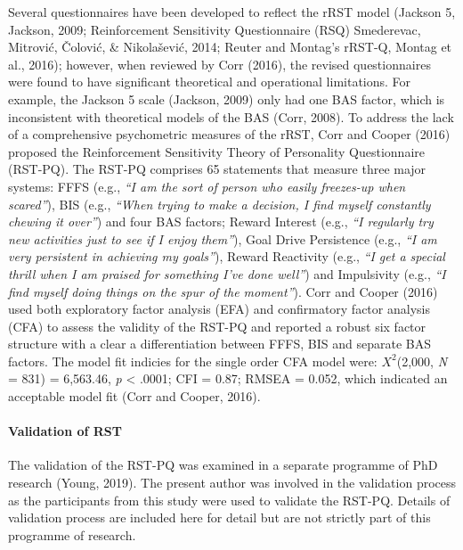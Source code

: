 \documentclass[man,floatsintext]{apa6}
\let\oldparagraph\paragraph
\renewcommand{\paragraph}[1]{\oldparagraph{#1}\mbox{}}
\begin{document}
Several questionnaires have been developed to reflect the rRST model (Jackson 5, Jackson, 2009; Reinforcement Sensitivity Questionnaire (RSQ) Smederevac, Mitrović, Čolović, \& Nikolašević, 2014; Reuter and Montag's rRST-Q, Montag et al., 2016); however, when reviewed by Corr (2016), the revised questionnaires were found to have significant theoretical and operational limitations.
For example, the Jackson 5 scale (Jackson, 2009) only had one BAS factor, which is inconsistent with theoretical models of the BAS (Corr, 2008).
To address the lack of a comprehensive psychometric measures of the rRST, Corr and Cooper
(2016) proposed the Reinforcement Sensitivity Theory of Personality Questionnaire (RST-PQ).
The RST-PQ comprises 65 statements that measure three major systems: FFFS (e.g., \emph{\enquote{I am the sort of person who easily freezes-up when scared}}), BIS (e.g., \emph{\enquote{When trying to make a decision, I find myself constantly chewing it over}}) and four BAS factors; Reward Interest (e.g., \emph{\enquote{I regularly try new activities just to see if I enjoy them}}), Goal Drive Persistence (e.g., \emph{\enquote{I am very persistent in achieving my goals}}), Reward Reactivity (e.g., \emph{\enquote{I get a special thrill when I am praised for something I've done well}}) and Impulsivity (e.g., \emph{\enquote{I find myself doing things on the spur of the moment}}).
Corr and Cooper (2016) used both exploratory factor analysis (EFA) and confirmatory factor analysis (CFA) to assess the validity of the RST-PQ and reported a robust six factor structure with a clear a differentiation between FFFS, BIS and separate BAS factors.
The model fit indicies for the single order CFA model were: \(X^2\)(2,000, \emph{N} = 831) = 6,563.46, \emph{p} \textless{} .0001; CFI = 0.87; RMSEA = 0.052, which indicated an acceptable model fit (Corr and Cooper, 2016).

\hypertarget{validation-of-rst}{%
\paragraph{Validation of RST}\label{validation-of-rst}}

The validation of the RST-PQ was examined in a separate programme of PhD research (Young, 2019).
The present author was involved in the validation process as the participants from this study were used to validate the RST-PQ.
Details of validation process are included here for detail but are not strictly part of this programme of research.
\end{document}
